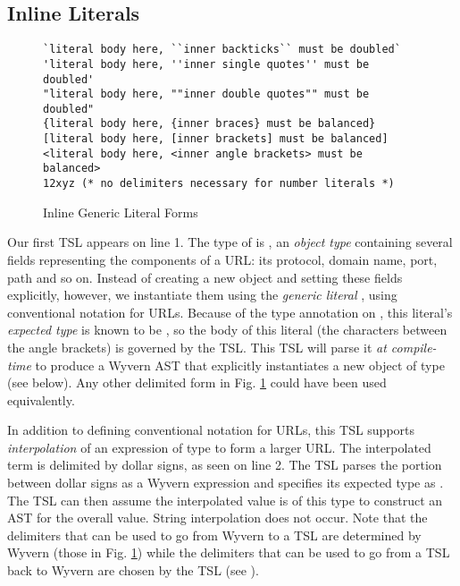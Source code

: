 \subsection{Inline Literals}
\begin{figure}[t]
\begin{lstlisting}[mathescape]
`literal body here, ``inner backticks`` must be doubled`
'literal body here, ''inner single quotes'' must be doubled'
"literal body here, ""inner double quotes"" must be doubled"
{literal body here, {inner braces} must be balanced}
[literal body here, [inner brackets] must be balanced]
<literal body here, <inner angle brackets> must be balanced>
12xyz (* no delimiters necessary for number literals *)
\end{lstlisting}
\vspace{-8px}
\caption{Inline Generic Literal Forms }
\vspace{-10px}
\label{f-delims}
\end{figure}
Our first TSL appears on line 1. The type of  is , an \emph{object type} containing several fields representing the components of a URL: its protocol, domain name, port, path and so on. Instead of creating a new object and setting these fields explicitly, however, we instantiate them using the \emph{generic literal} , using conventional notation for URLs. Because of the type annotation on , this literal's \emph{expected type} is known to be , so the body of this literal (the characters between the angle brackets) is governed by the  TSL. This TSL will parse it \emph{at compile-time} to produce a Wyvern AST that explicitly instantiates a new object of type   (see below). Any other delimited form in Fig. \ref{f-delims} could have been used equivalently.

In addition to defining conventional notation for URLs, this TSL supports \emph{interpolation} of an expression of type  to form a larger URL. The interpolated term is delimited by dollar signs, as seen on line 2. The TSL parses the portion between dollar signs as a Wyvern expression and specifies its expected type as  . The TSL can then assume the interpolated value is of this type to construct an AST for the overall value. String interpolation does not occur. Note that the delimiters that can be used to go from Wyvern to a TSL are determined by Wyvern (those in Fig. \ref{f-delims}) while the delimiters that can be used to go from a TSL back to Wyvern are chosen by the TSL (see ).

